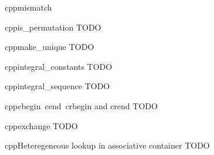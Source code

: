 \documentclass[10pt,a4paper]{article}
\begin{document}
\begin{multicols}{3}
\begin{codebox}{cpp}{mismatch}
\end{codebox}

\begin{codebox}{cpp}{is\_permutation}
TODO

\end{codebox}

\begin{codebox}{cpp}{make\_unique}
TODO

\end{codebox}

\begin{codebox}{cpp}{integral\_constants}
TODO

\end{codebox}

\begin{codebox}{cpp}{integral\_sequence}
TODO

\end{codebox}

\begin{codebox}{cpp}{cbegin\, cend\, crbegin and crend}
TODO

\end{codebox}

\begin{codebox}{cpp}{exchange}
TODO

\end{codebox}

\begin{codebox}{cpp}{Heteregeneous lookup in associative container}
TODO

\end{codebox}


\AtNextBibliography{\footnotesize}
\printbibliography  
\end{multicols}
\end{document}
